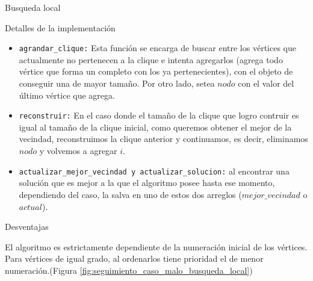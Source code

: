 \begin{section}{Busqueda local}
\begin{subsection}{Detalles de la implementación}
\begin{itemize}
			\item \texttt{agrandar\_clique:} Esta función se encarga de buscar entre los vértices que actualmente no pertenecen a la clique e intenta agregarlos (agrega todo vértice que forma un completo con los ya pertenecientes), con el objeto de conseguir una de mayor tamaño. Por otro lado, setea $nodo$ con el valor del último vértice que agrega.

			\item \texttt{reconstruir:} En el caso donde el tamaño de la clique que logro contruir es igual al tamaño de la clique inicial, como queremos obtener el mejor de la vecindad, reconstruimos la clique anterior y continuamos, es decir, eliminamos $nodo$ y volvemos a agregar $i$.
			
			\item \texttt{actualizar\_mejor\_vecindad y actualizar\_solucion:} al encontrar una solución que es mejor a la que el algoritmo posee hasta ese momento, dependiendo del caso, la salva en uno de estos dos arreglos ($mejor\_vecindad$ o $actual$).
			
		\end{itemize}
		\end{subsection}
		\begin{subsection}{Desventajas}
		
		El algoritmo es estrictamente dependiente de la numeración inicial de los vértices. Para vértices de igual grado, al ordenarlos tiene prioridad el de menor numeración.(Figura \ref{fig:seguimiento_caso_malo_busqueda_local})


\end{subsection}
\end{section}
